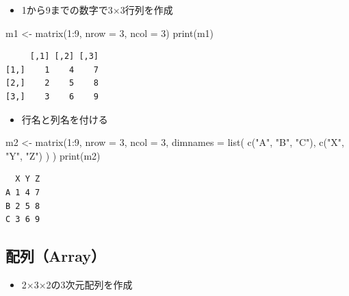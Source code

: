 \documentclass[
  a4paper,
]{ltjsbook}
\newenvironment{Shaded}{\begin{snugshade}}{\end{snugshade}}
\newcommand{\AttributeTok}[1]{\textcolor[rgb]{0.40,0.45,0.13}{#1}}
\newcommand{\DecValTok}[1]{\textcolor[rgb]{0.68,0.00,0.00}{#1}}
\newcommand{\FunctionTok}[1]{\textcolor[rgb]{0.28,0.35,0.67}{#1}}
\newcommand{\NormalTok}[1]{\textcolor[rgb]{0.00,0.23,0.31}{#1}}
\newcommand{\OtherTok}[1]{\textcolor[rgb]{0.00,0.23,0.31}{#1}}
\newcommand{\SpecialCharTok}[1]{\textcolor[rgb]{0.37,0.37,0.37}{#1}}
\newcommand{\StringTok}[1]{\textcolor[rgb]{0.13,0.47,0.30}{#1}}
\providecommand{\tightlist}{%
  \setlength{\itemsep}{0pt}\setlength{\parskip}{0pt}}\usepackage{longtable,booktabs,array}
\begin{document}
\begin{itemize}
\tightlist
\item
  1から9までの数字で3×3行列を作成
\end{itemize}

\begin{Shaded}
\begin{Highlighting}[]
\NormalTok{m1 }\OtherTok{\textless{}{-}} \FunctionTok{matrix}\NormalTok{(}\DecValTok{1}\SpecialCharTok{:}\DecValTok{9}\NormalTok{, }\AttributeTok{nrow =} \DecValTok{3}\NormalTok{, }\AttributeTok{ncol =} \DecValTok{3}\NormalTok{)}
\FunctionTok{print}\NormalTok{(m1)}
\end{Highlighting}
\end{Shaded}

\begin{verbatim}
     [,1] [,2] [,3]
[1,]    1    4    7
[2,]    2    5    8
[3,]    3    6    9
\end{verbatim}

\begin{itemize}
\tightlist
\item
  行名と列名を付ける
\end{itemize}

\begin{Shaded}
\begin{Highlighting}[]
\NormalTok{m2 }\OtherTok{\textless{}{-}} \FunctionTok{matrix}\NormalTok{(}\DecValTok{1}\SpecialCharTok{:}\DecValTok{9}\NormalTok{,}
    \AttributeTok{nrow =} \DecValTok{3}\NormalTok{, }\AttributeTok{ncol =} \DecValTok{3}\NormalTok{,}
    \AttributeTok{dimnames =} \FunctionTok{list}\NormalTok{(}
        \FunctionTok{c}\NormalTok{(}\StringTok{"A"}\NormalTok{, }\StringTok{"B"}\NormalTok{, }\StringTok{"C"}\NormalTok{),}
        \FunctionTok{c}\NormalTok{(}\StringTok{"X"}\NormalTok{, }\StringTok{"Y"}\NormalTok{, }\StringTok{"Z"}\NormalTok{)}
\NormalTok{    )}
\NormalTok{)}
\FunctionTok{print}\NormalTok{(m2)}
\end{Highlighting}
\end{Shaded}

\begin{verbatim}
  X Y Z
A 1 4 7
B 2 5 8
C 3 6 9
\end{verbatim}

\subsection{配列（Array）}\label{ux914dux5217array}

\begin{itemize}
\tightlist
\item
  2×3×2の3次元配列を作成
\end{itemize}
\end{document}
